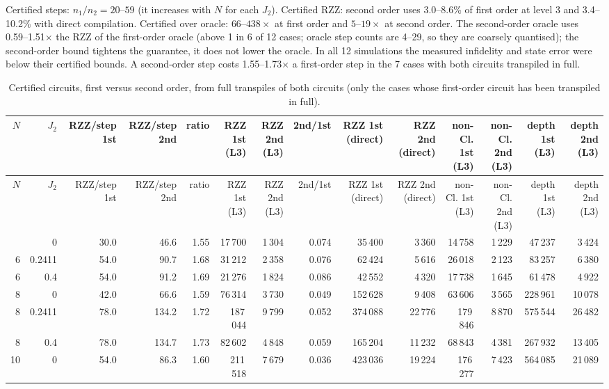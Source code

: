 \documentclass[11pt]{article}
\begin{document}
Certified steps: $n_1/n_2=20$--$59$ (it increases with $N$ for each $J_2$). Certified RZZ: second order uses 3.0--8.6\% of first order at level 3 and 3.4--10.2\% with direct compilation. Certified over oracle: $66$--$438\times$ at first order and $5$--$19\times$ at second order. The second-order oracle uses 0.59--1.51$\times$ the RZZ of the first-order oracle (above 1 in 6 of 12 cases; oracle step counts are 4--29, so they are coarsely quantised); the second-order bound tightens the guarantee, it does not lower the oracle. In all 12 simulations the measured infidelity and state error were below their certified bounds. A second-order step costs 1.55--1.73$\times$ a first-order step in the 7 cases with both circuits transpiled in full.
{\small
\begin{longtable}{rrrrrrrrrrrrrr}
\caption{Certified circuits, first versus second order, from full transpiles of both circuits (only the cases whose first-order circuit has been transpiled in full).}\label{tab:so2}\\
\toprule
$N$ & $J_2$ & RZZ/step 1st & RZZ/step 2nd & ratio & RZZ 1st (L3) & RZZ 2nd (L3) & 2nd/1st & RZZ 1st (direct) & RZZ 2nd (direct) & non-Cl. 1st (L3) & non-Cl. 2nd (L3) & depth 1st (L3) & depth 2nd (L3) \\
\midrule
\endfirsthead
\toprule
$N$ & $J_2$ & RZZ/step 1st & RZZ/step 2nd & ratio & RZZ 1st (L3) & RZZ 2nd (L3) & 2nd/1st & RZZ 1st (direct) & RZZ 2nd (direct) & non-Cl. 1st (L3) & non-Cl. 2nd (L3) & depth 1st (L3) & depth 2nd (L3) \\
\midrule
\endhead
\bottomrule
\endfoot
6 & 0 & 30.0 & 46.6 & 1.55 & 17\,700 & 1\,304 & 0.074 & 35\,400 & 3\,360 & 14\,758 & 1\,229 & 47\,237 & 3\,424 \\
6 & 0.2411 & 54.0 & 90.7 & 1.68 & 31\,212 & 2\,358 & 0.076 & 62\,424 & 5\,616 & 26\,018 & 2\,123 & 83\,257 & 6\,380 \\
6 & 0.4 & 54.0 & 91.2 & 1.69 & 21\,276 & 1\,824 & 0.086 & 42\,552 & 4\,320 & 17\,738 & 1\,645 & 61\,478 & 4\,922 \\
8 & 0 & 42.0 & 66.6 & 1.59 & 76\,314 & 3\,730 & 0.049 & 152\,628 & 9\,408 & 63\,606 & 3\,565 & 228\,961 & 10\,078 \\
8 & 0.2411 & 78.0 & 134.2 & 1.72 & 187\,044 & 9\,799 & 0.052 & 374\,088 & 22\,776 & 179\,846 & 8\,870 & 575\,544 & 26\,482 \\
8 & 0.4 & 78.0 & 134.7 & 1.73 & 82\,602 & 4\,848 & 0.059 & 165\,204 & 11\,232 & 68\,843 & 4\,381 & 267\,932 & 13\,405 \\
10 & 0 & 54.0 & 86.3 & 1.60 & 211\,518 & 7\,679 & 0.036 & 423\,036 & 19\,224 & 176\,277 & 7\,423 & 564\,085 & 21\,089 \\
\end{longtable}
}
\end{document}
